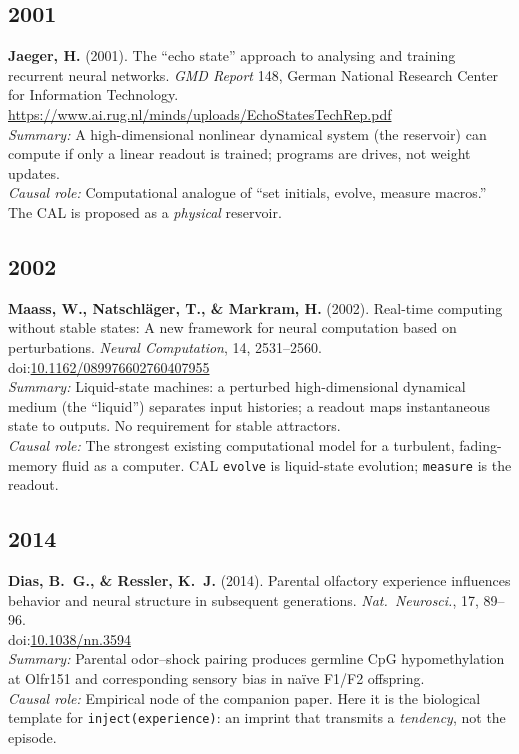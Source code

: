 \documentclass[11pt,a4paper]{article}
\providecommand{\doi}{doi}
\begin{document}
\subsection*{2001}
\textbf{Jaeger, H.} (2001). The ``echo state'' approach to analysing and training recurrent neural networks. \textit{GMD Report} 148, German National Research Center for Information Technology.  \\
\url{https://www.ai.rug.nl/minds/uploads/EchoStatesTechRep.pdf}\\
\textit{Summary:} A high-dimensional nonlinear dynamical system (the reservoir) can compute if only a linear readout is trained; programs are drives, not weight updates.\\
\textit{Causal role:} Computational analogue of ``set initials, evolve, measure macros.'' The CAL is proposed as a \emph{physical} reservoir.

\subsection*{2002}
\textbf{Maass, W., Natschl\"ager, T., \& Markram, H.} (2002). Real-time computing without stable states: A new framework for neural computation based on perturbations. \textit{Neural Computation}, 14, 2531--2560.  \\
\doi:\url{10.1162/089976602760407955}\\
\textit{Summary:} Liquid-state machines: a perturbed high-dimensional dynamical medium (the ``liquid'') separates input histories; a readout maps instantaneous state to outputs. No requirement for stable attractors.\\
\textit{Causal role:} The strongest existing computational model for a turbulent, fading-memory fluid as a computer. CAL \texttt{evolve} is liquid-state evolution; \texttt{measure} is the readout.

\subsection*{2014}
\textbf{Dias, B.~G., \& Ressler, K.~J.} (2014). Parental olfactory experience influences behavior and neural structure in subsequent generations. \textit{Nat.\ Neurosci.}, 17, 89--96.  \\
\doi:\url{10.1038/nn.3594}\\
\textit{Summary:} Parental odor--shock pairing produces germline CpG hypomethylation at Olfr151 and corresponding sensory bias in na\"ive F1/F2 offspring.\\
\textit{Causal role:} Empirical node of the companion paper. Here it is the biological template for \texttt{inject(experience)}: an imprint that transmits a \emph{tendency}, not the episode.
\end{document}
